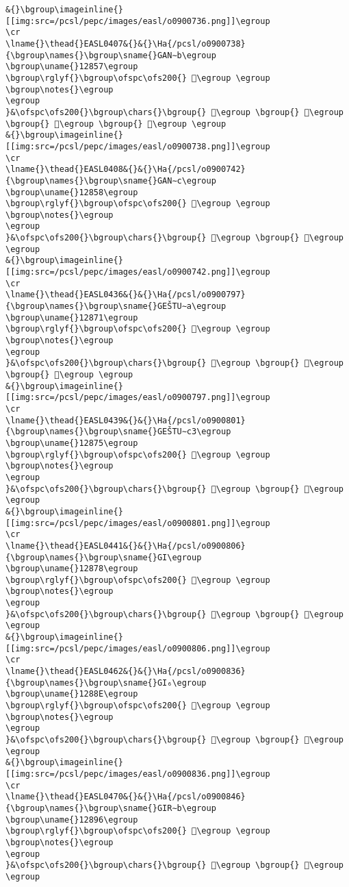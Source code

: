 \begin{verbatim}
&{}\bgroup\imageinline{}[[img:src=/pcsl/pepc/images/easl/o0900736.png]]\egroup
\cr
\lname{}\thead{}EASL0407&{}&{}\Ha{/pcsl/o0900738}{\bgroup\names{}\bgroup\sname{}GAN∼b\egroup
\bgroup\uname{}12857\egroup
\bgroup\rglyf{}\bgroup\ofspc\ofs200{} 𒡗\egroup \egroup
\bgroup\notes{}\egroup
\egroup
}&\ofspc\ofs200{}\bgroup\chars{}\bgroup{} 𒡔\egroup \bgroup{} 𒡕\egroup \bgroup{} 𒡖\egroup \bgroup{} 𒡗\egroup \egroup
&{}\bgroup\imageinline{}[[img:src=/pcsl/pepc/images/easl/o0900738.png]]\egroup
\cr
\lname{}\thead{}EASL0408&{}&{}\Ha{/pcsl/o0900742}{\bgroup\names{}\bgroup\sname{}GAN∼c\egroup
\bgroup\uname{}12858\egroup
\bgroup\rglyf{}\bgroup\ofspc\ofs200{} 𒡘\egroup \egroup
\bgroup\notes{}\egroup
\egroup
}&\ofspc\ofs200{}\bgroup\chars{}\bgroup{} 𒡘\egroup \bgroup{} 𒡠\egroup \egroup
&{}\bgroup\imageinline{}[[img:src=/pcsl/pepc/images/easl/o0900742.png]]\egroup
\cr
\lname{}\thead{}EASL0436&{}&{}\Ha{/pcsl/o0900797}{\bgroup\names{}\bgroup\sname{}GEŠTU∼a\egroup
\bgroup\uname{}12871\egroup
\bgroup\rglyf{}\bgroup\ofspc\ofs200{} 𒡱\egroup \egroup
\bgroup\notes{}\egroup
\egroup
}&\ofspc\ofs200{}\bgroup\chars{}\bgroup{} 𒡱\egroup \bgroup{} 𒡲\egroup \bgroup{} 𒡳\egroup \egroup
&{}\bgroup\imageinline{}[[img:src=/pcsl/pepc/images/easl/o0900797.png]]\egroup
\cr
\lname{}\thead{}EASL0439&{}&{}\Ha{/pcsl/o0900801}{\bgroup\names{}\bgroup\sname{}GEŠTU∼c3\egroup
\bgroup\uname{}12875\egroup
\bgroup\rglyf{}\bgroup\ofspc\ofs200{} 𒡵\egroup \egroup
\bgroup\notes{}\egroup
\egroup
}&\ofspc\ofs200{}\bgroup\chars{}\bgroup{} 𒡵\egroup \bgroup{} 𒡶\egroup \egroup
&{}\bgroup\imageinline{}[[img:src=/pcsl/pepc/images/easl/o0900801.png]]\egroup
\cr
\lname{}\thead{}EASL0441&{}&{}\Ha{/pcsl/o0900806}{\bgroup\names{}\bgroup\sname{}GI\egroup
\bgroup\uname{}12878\egroup
\bgroup\rglyf{}\bgroup\ofspc\ofs200{} 𒡸\egroup \egroup
\bgroup\notes{}\egroup
\egroup
}&\ofspc\ofs200{}\bgroup\chars{}\bgroup{} 𒢄\egroup \bgroup{} 𒡸\egroup \egroup
&{}\bgroup\imageinline{}[[img:src=/pcsl/pepc/images/easl/o0900806.png]]\egroup
\cr
\lname{}\thead{}EASL0462&{}&{}\Ha{/pcsl/o0900836}{\bgroup\names{}\bgroup\sname{}GI₆\egroup
\bgroup\uname{}1288E\egroup
\bgroup\rglyf{}\bgroup\ofspc\ofs200{} 𒢎\egroup \egroup
\bgroup\notes{}\egroup
\egroup
}&\ofspc\ofs200{}\bgroup\chars{}\bgroup{} 𒢏\egroup \bgroup{} 𒢎\egroup \egroup
&{}\bgroup\imageinline{}[[img:src=/pcsl/pepc/images/easl/o0900836.png]]\egroup
\cr
\lname{}\thead{}EASL0470&{}&{}\Ha{/pcsl/o0900846}{\bgroup\names{}\bgroup\sname{}GIR∼b\egroup
\bgroup\uname{}12896\egroup
\bgroup\rglyf{}\bgroup\ofspc\ofs200{} 𒢖\egroup \egroup
\bgroup\notes{}\egroup
\egroup
}&\ofspc\ofs200{}\bgroup\chars{}\bgroup{} 𒢕\egroup \bgroup{} 𒢖\egroup \egroup

\end{verbatim}
